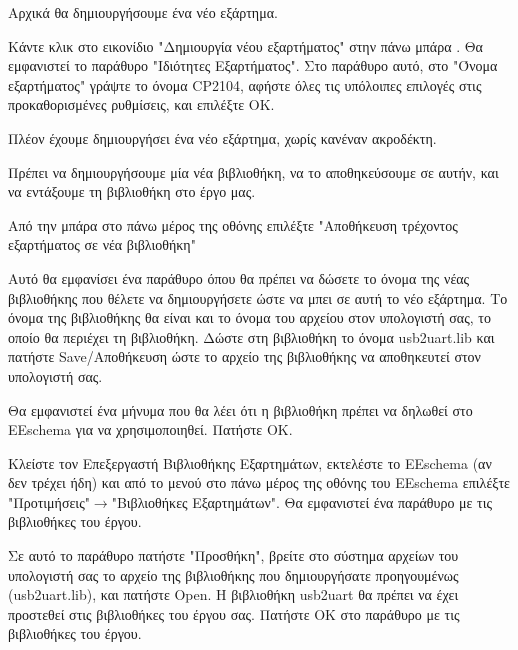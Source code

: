 \documentclass[a4paper]{article}
\begin{document}
Αρχικά θα δημιουργήσουμε ένα νέο εξάρτημα.

Κάντε κλικ στο εικονίδιο "Δημιουργία νέου εξαρτήματος" στην πάνω μπάρα %
. Θα εμφανιστεί το παράθυρο "Ιδιότητες Εξαρτήματος". Στο παράθυρο αυτό, στο "Όνομα εξαρτήματος" γράψτε το όνομα CP2104, αφήστε όλες τις υπόλοιπες επιλογές στις προκαθορισμένες ρυθμίσεις, και επιλέξτε ΟΚ.

\begin{figure}
  \begin{center}
    \label{fig:kicad-main}
  \end{center}
\end{figure}

Πλέον έχουμε δημιουργήσει ένα νέο εξάρτημα, χωρίς κανέναν ακροδέκτη. 

Πρέπει να δημιουργήσουμε μία νέα βιβλιοθήκη, να το αποθηκεύσουμε σε αυτήν, και να εντάξουμε τη βιβλιοθήκη στο έργο μας.

Από την μπάρα στο πάνω μέρος της οθόνης επιλέξτε "Αποθήκευση τρέχοντος εξαρτήματος σε νέα βιβλιοθήκη" %

Αυτό θα εμφανίσει ένα παράθυρο όπου θα πρέπει να δώσετε το όνομα της νέας βιβλιοθήκης που θέλετε να δημιουργήσετε ώστε να μπει σε αυτή το νέο εξάρτημα. Το όνομα της βιβλιοθήκης θα είναι και το όνομα του αρχείου στον υπολογιστή σας, το οποίο θα περιέχει τη βιβλιοθήκη. Δώστε στη βιβλιοθήκη το όνομα usb2uart.lib και πατήστε Save/Αποθήκευση ώστε το αρχείο της βιβλιοθήκης να αποθηκευτεί στον υπολογιστή σας. 

Θα εμφανιστεί ένα μήνυμα που θα λέει ότι η βιβλιοθήκη πρέπει να δηλωθεί στο EEschema για να χρησιμοποιηθεί. Πατήστε ΟΚ.

Κλείστε τον Επεξεργαστή Βιβλιοθήκης Εξαρτημάτων, εκτελέστε το EEschema (αν δεν τρέχει ήδη) και από το μενού στο πάνω μέρος της οθόνης του EEschema επιλέξτε "Προτιμήσεις"$\rightarrow$"Βιβλιοθήκες Εξαρτημάτων". Θα εμφανιστεί ένα παράθυρο με τις βιβλιοθήκες του έργου. 

Σε αυτό το παράθυρο πατήστε "Προσθήκη", βρείτε στο σύστημα αρχείων του υπολογιστή σας το αρχείο της βιβλιοθήκης που δημιουργήσατε προηγουμένως (usb2uart.lib), και πατήστε Open. Η βιβλιοθήκη usb2uart θα πρέπει να έχει προστεθεί στις βιβλιοθήκες του έργου σας. Πατήστε ΟΚ στο παράθυρο με τις βιβλιοθήκες του έργου.

\begin{figure}
  \begin{center}
    \label{fig:kicad-main}
  \end{center}
\end{figure}
\end{document}
